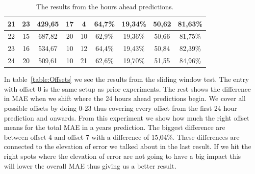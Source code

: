 \begin{table}[H]
{\begin{tabular}{|c|c|c|c|c|c|c|c|c|}
	21 & 23  & 429,65 & 17 & 4  & 64,7\% & 19,34\% & 50,62 & 81,63\% \\ \hline
	22 & 15  & 687,82 & 20 & 10 & 62,9\% & 19,36\% & 50,66 & 81,75\% \\ \hline
	23 & 16  & 534,67 & 10 & 12 & 64,4\% & 19,43\% & 50,84 & 82,39\% \\ \hline
	24 & 20  & 509,61 & 10 & 21 & 62,6\% & 19,70\% & 51,55 & 84,96\% \\ \hline
	\end{tabular}
}
\caption{The results from the hours ahead predictions.} %
\label{table:XHoursAhead} %
\end{table}

In table~\ref{table:Offsets} we see the results from the sliding window test. The entry with offset 0 is the same setup as prior experiments. The rest shows the difference in MAE when we shift where the 24 hours ahead predictions begin. We cover all possible offsets by doing 0-23 thus covering every offset from the first 24 hour prediction and onwards. From this experiment we show how much the right offset means for the total MAE in a years prediction. The biggest difference are between offset 4 and offset 7 with a difference of 15,04\%. These differences are connected to the elevation of error we talked about in the last result. If we hit the right spots where the elevation of error are not going to have a big impact this will lower the overall MAE thus giving us a better result.  


